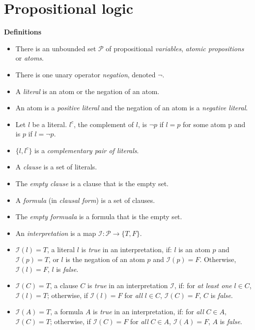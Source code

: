 \documentclass[11pt]{report}
\newcommand*{\ngg}{\mathop{\neg}}
\begin{document}
\chapter{Propositional logic}\label{ch.intro}

\begin{center}
\textbf{Definitions}
\end{center}

\begin{itemize}
\item There is an unbounded set $\mathcal{P}$ of propositional
\emph{variables}, \emph{atomic propositions} or \emph{atoms}.
\item There is one unary operator \emph{negation}, denoted $\ngg$.
\item A \emph{literal} is an atom or the negation of an atom.
\item An atom is a \emph{positive literal} and the negation of an atom
is a \emph{negative literal}.
\item Let $l$ be a literal. $l^c$, the complement of $l$, is $\ngg p$ if
$l=p$ for some atom p and is $p$ if $l=\ngg p$.
\item $\{l,l^c\}$ is a \emph{complementary pair of literals}.
\item A \emph{clause} is a set of literals.
\item The \emph{empty clause} is a clause that is the empty set.
\item A \emph{formula} (in \emph{clausal form}) is a set of clauses.
\item The \emph{empty formuala} is a formula that is the empty set.

\item An \emph{interpretation} is a map $\mathcal{I}: \mathcal{P}
\rightarrow \{T,F\}$.

\item $\mathcal{I}(l)=T$, a literal $l$ is \emph{true} in an
interpretation, if: $l$ is an atom $p$ and $\mathcal{I}(p)=T$, or $l$ is
the negation of an atom $p$ and $\mathcal{I}(p)=F$. Otherwise,
$\mathcal{I}(l)=F$, $l$ is \emph{false}.

\item $\mathcal{I}(C)=T$, a clause $C$ is \emph{true} in an
interpretation $\mathcal{I}$, if: for \emph{at least one} $l\in C$,
$\mathcal{I}(l)=T$; otherwise, if $\mathcal{I}(l)=F$ for \emph{all}
$l\in C$, $\mathcal{I}(C)=F$, $C$ is \emph{false}.

\item $\mathcal{I}(A)=T$, a formula $A$ is \emph{true} in an
interpretation, if: for \emph{all} $C\in A$, $\mathcal{I}(C)=T$;
otherwise, if $\mathcal{I}(C)=F$ for \emph{all} $C\in A$,
$\mathcal{I}(A)=F$, $A$ is \emph{false}.


\end{itemize}
\end{document}

